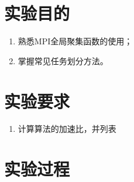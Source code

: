 \documentclass[UTF8,a4paper,12pt]{article}
\begin{document}
\section{实验目的}
\begin{enumerate}[itemindent=0.5em,label=(\arabic*)]
  \item 熟悉MPI全局聚集函数的使用；
  \item 掌握常见任务划分方法。
\end{enumerate}

\section{实验要求}
\begin{enumerate}[itemindent=0.5em,label=(\arabic*)]
  \item 计算算法的加速比，并列表
\end{enumerate}
\section{实验过程}
\end{document}
